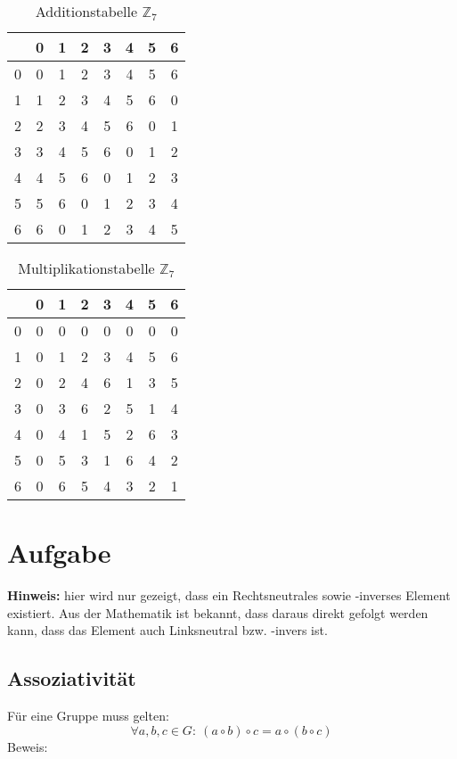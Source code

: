 \documentclass[DIN, pagenumber=false, fontsize=11pt, parskip=half]{scrartcl}
\begin{document}
    \begin{table}[H]
    \centering
    \begin{tabular}{c|ccccccc}
    \toprule
     & 0 & 1 & 2 & 3 & 4 & 5 & 6\\
    \midrule
    0 & 0 & 1 & 2 & 3 & 4 & 5 & 6\\
    1 & 1 & 2 & 3 & 4 & 5 & 6 & 0\\
    2 & 2 & 3 & 4 & 5 & 6 & 0 & 1\\
    3 & 3 & 4 & 5 & 6 & 0 & 1 & 2\\
    4 & 4 & 5 & 6 & 0 & 1 & 2 & 3\\
    5 & 5 & 6 & 0 & 1 & 2 & 3 & 4\\
    6 & 6 & 0 & 1 & 2 & 3 & 4 & 5\\
    \bottomrule
    \end{tabular}
    \caption{Additionstabelle $\mathbb{Z}_7$}
    \end{table}

    \begin{table}[H]
    \centering
    \begin{tabular}{c|ccccccc}
    \toprule
     & 0 & 1 & 2 & 3 & 4 & 5 & 6\\
    \midrule
    0 & 0 & 0 & 0 & 0 & 0 & 0 & 0\\
    1 & 0 & 1 & 2 & 3 & 4 & 5 & 6\\
    2 & 0 & 2 & 4 & 6 & 1 & 3 & 5\\
    3 & 0 & 3 & 6 & 2 & 5 & 1 & 4\\
    4 & 0 & 4 & 1 & 5 & 2 & 6 & 3\\
    5 & 0 & 5 & 3 & 1 & 6 & 4 & 2\\
    6 & 0 & 6 & 5 & 4 & 3 & 2 & 1\\
    \bottomrule
    \end{tabular}
    \caption{Multiplikationstabelle $\mathbb{Z}_7$}
    \end{table}

    \section{Aufgabe}
    \textbf{Hinweis:} hier wird nur gezeigt, dass ein Rechtsneutrales sowie -inverses
    Element existiert. Aus der Mathematik ist bekannt, dass daraus direkt gefolgt werden
    kann, dass das Element auch Linksneutral bzw. -invers ist.

    \subsection{Assoziativität}
    Für eine Gruppe muss gelten:
    \begin{equation}
        \forall a, b, c \in G:\ (a \circ b) \circ c = a \circ (b \circ c)
    \end{equation}
    Beweis:
\end{document}
